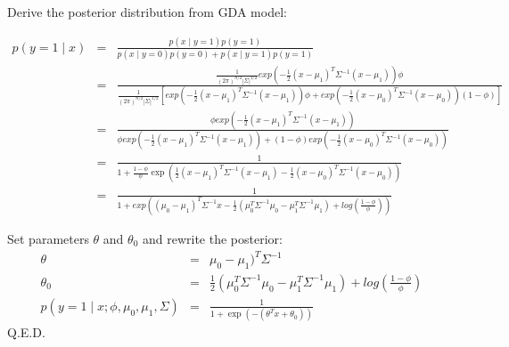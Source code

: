 \begin{answer}

Derive the posterior distribution from GDA model:

\begin{eqnarray*}
	p(y = 1\mid x)
	&=& \frac{p(x \mid y = 1) p(y = 1)}{p(x \mid y = 0) p(y = 0) + p(x \mid y = 1) p(y = 1)} \\
	&=& \frac {\frac{1}{(2\pi)^{n/2} |\Sigma|^{1/2}} exp \left( -\frac{1}{2}(x-\mu_1)^T \Sigma^{-1}(x-\mu_1)\right) \phi}
		{\frac{1}{(2\pi)^{n/2} |\Sigma|^{1/2}} \left[ exp \left( -\frac{1}{2}(x-\mu_1)^T \Sigma^{-1}(x-\mu_1)\right) \phi
		+ exp \left( -\frac{1}{2}(x-\mu_0)^T \Sigma^{-1}(x-\mu_0)\right) (1-\phi) \right ]} \\
	&=& \frac { \phi exp \left( -\frac{1}{2}(x-\mu_1)^T \Sigma^{-1}(x-\mu_1)\right)}
		{ \phi exp \left( -\frac{1}{2}(x-\mu_1)^T \Sigma^{-1}(x-\mu_1)\right)
		+ (1-\phi) exp \left( -\frac{1}{2}(x-\mu_0)^T \Sigma^{-1}(x-\mu_0)\right)} \\
	&=& \frac {1} {1 + \frac{1-\phi}{\phi} \exp \left (\frac{1}{2}(x-\mu_1)^T \Sigma^{-1}(x-\mu_1) 
		- \frac{1}{2}(x-\mu_0)^T \Sigma^{-1}(x-\mu_0) \right)} \\
	&=& \frac {1} {1 + exp \left( (\mu_0 - \mu_1)^T \Sigma^{-1} x 
		- \frac{1}{2}(\mu_0^T \Sigma^{-1}\mu_0 - \mu_1^T \Sigma^{-1}\mu_1)
		+ log (\frac{1-\phi}{\phi}) \right)}
\end{eqnarray*}

Set parameters $\theta$ and $\theta_0$ and rewrite the posterior:
\begin{eqnarray*}
	\theta &=& \mu_0 - \mu_1)^T \Sigma^{-1} \\
	\theta_0 &=& \frac{1}{2}(\mu_0^T \Sigma^{-1}\mu_0 - \mu_1^T \Sigma^{-1}\mu_1)	+ log (\frac{1-\phi}{\phi}) \\
	p(y = 1\mid x; \phi, \mu_0, \mu_1, \Sigma)
	&=& \frac{1}{1 + \exp(-(\theta^T x + \theta_0))}
\end{eqnarray*}
Q.E.D.
\end{answer}
